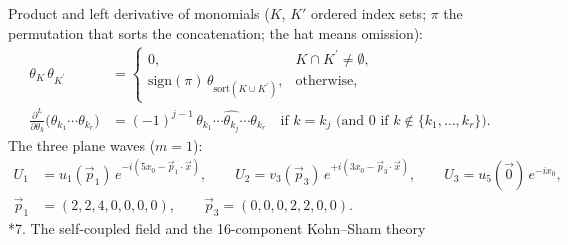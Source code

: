 \documentclass[10pt,a4paper]{article}
\makeatletter
\renewcommand\section{\@startsection{section}{1}{\z@}{-3.5ex \@plus -1ex \@minus -.2ex}{2.3ex \@plus.2ex}{\normalfont\Large\bfseries\raggedright}}
\makeatother
\begin{document}
Product and left derivative of monomials ($K$, $K'$ ordered index sets; $\pi$ the permutation that sorts the concatenation; the hat means omission):
\begin{align*}
\theta_K\,\theta_{K^{\prime}}&=\begin{cases}0,&K\cap K^{\prime}\neq\emptyset,\\ \mathrm{sign}(\pi)\,\theta_{\mathrm{sort}(K\cup K^{\prime})},&\text{otherwise},\end{cases} \\
\frac{\partial^{L}}{\partial\theta_k}\big(\theta_{k_1}\cdots\theta_{k_r}\big)&=(-1)^{j-1}\,\theta_{k_1}\cdots\widehat{\theta_{k_j}}\cdots\theta_{k_r}\quad\text{if }k=k_j\text{ (and }0\text{ if }k\notin\lbrace k_1,\dots,k_r\rbrace).
\end{align*}
The three plane waves ($m=1$):
\begin{align*}
U_1&=u_1(\vec p_1)\,e^{-i(5x_0-\vec p_1\cdot\vec x)},\qquad U_2=v_3(\vec p_3)\,e^{+i(3x_0-\vec p_3\cdot\vec x)},\qquad U_3=u_5(\vec 0)\,e^{-ix_0}, \\
\vec p_1&=(2,2,4,0,0,0,0),\qquad \vec p_3=(0,0,0,2,2,0,0).
\end{align*}
\section*{7. The self-coupled field and the 16-component Kohn–Sham theory}
\end{document}
